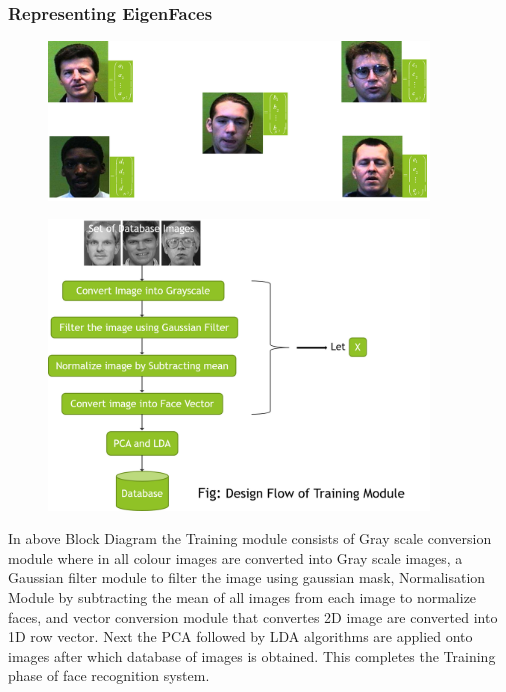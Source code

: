 \documentclass[xcolor=dvipsnames]{beamer}
\begin{document}
     \begin{frame}
    \frametitle{Representing EigenFaces}
    \begin{figure}[H]
        \graphicspath{{figs/}}
        \includegraphics[width=0.9\textwidth]{img3.png}
    \end{figure}
    \end{frame}
    
    \begin{frame}
    \begin{figure}[H]
        \graphicspath{{figs/}}
        \includegraphics[width=0.9\textwidth]{img4.png}
    \end{figure}
    \end{frame}
    
      \begin{frame}
    In above Block Diagram the Training module consists of Gray scale conversion module where in all colour images are converted into Gray scale images, a Gaussian filter module to filter the image using gaussian mask, Normalisation Module by subtracting the mean of all images from each image to normalize faces, and vector conversion module that convertes 2D image are converted into 1D row vector. \newline
	Next the PCA followed by LDA algorithms are applied onto images after which database of images is obtained. This completes the Training phase of face recognition system.
       \end{frame}
\end{document}
